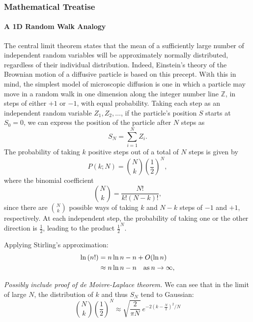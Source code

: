     \subsubsection{Mathematical Treatise}
      \paragraph{A 1D Random Walk Analogy}
      The central limit theorem states that the mean of a sufficiently large number of independent random variables will be approximately normally distributed, regardless of their individual distribution. Indeed, Einstein's theory of the Brownian motion of a diffusive particle is based on this precept. With this in mind, the simplest model of microscopic diffusion is one in which a particle may move in a random walk in one dimension along the integer number line $\mathbb{Z}$, in steps of either $+1$ or $-1$, with equal probability. Taking each step as an independent random variable $Z_1, Z_2,\ldots$, if the particle's position $S$ starts at $S_0 = 0$, we can express the position of the particle after $N$ steps as
      \begin{equation}
        S_N = \sum\limits_{i=1}^N Z_i .
      \end{equation}
      The probability of taking $k$ positive steps out of a total of $N$ steps is given by
      \begin{equation}
        P(k;N) = \binom{N}{k}\left(\frac{1}{2} \right)^N,
      \end{equation}
      where the binomial coefficient
      \begin{equation}
        \label{eq:registration:binomial-coefficient}
         \binom{N}{k} = \frac{N!}{k!(N-k)!},
      \end{equation}
      since there are $\binom{N}{k}$ possible ways of taking $k$ and $N - k$ steps of $-1$ and $+1$, respectively. At each independent step, the probability of taking one or the other direction is $\frac{1}{2}$, leading to the product $\frac{1}{2}^N$.
      
      Applying Stirling's approximation:
      \begin{align}
        \label{eq:registration:stirling}
        \ln \left( n! \right) &= n\ln n - n + O(\ln n) \notag \\
               &\approx n\ln n - n \quad \text{as}\: n \to \infty,
      \end{align}
      
      \emph{Possibly include proof of de Moivre-Laplace theorem.}
      We can see that in the limit of large $N$, the distribution of $k$ and thus $S_N$ tend to Gaussian:
      \begin{equation}
        \label{eq:registration:gaussian-approximation}
        \binom{N}{k}\left(\frac{1}{2}\right)^N \approx \sqrt{\frac{2}{\pi N}} \
          e^{-2(k - \frac{N}{2})^2/N}
      \end{equation}
      
